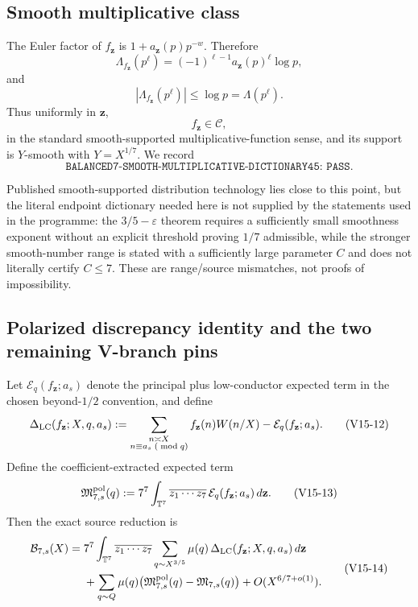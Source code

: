 \subsection*{Smooth multiplicative class}

The Euler factor of $f_{\mathbf z}$ is $1+a_{\mathbf z}(p)p^{-w}$.  Therefore
\[
 \Lambda_{f_{\mathbf z}}(p^\ell)
 =
 (-1)^{\ell-1}a_{\mathbf z}(p)^\ell\log p,
\]
and
\[
 |\Lambda_{f_{\mathbf z}}(p^\ell)|\le \log p=\Lambda(p^\ell).
 \tag{V15-10}
\]
Thus uniformly in $\mathbf z$,
\[
 f_{\mathbf z}\in\mathcal C,
\]
in the standard smooth-supported multiplicative-function sense, and its support is
$Y$-smooth with $Y=X^{1/7}$.
We record
\[
 \texttt{BALANCED7-SMOOTH-MULTIPLICATIVE-DICTIONARY45: PASS}.
 \tag{V15-11}
\]

Published smooth-supported distribution technology lies close to this point, but the
literal endpoint dictionary needed here is not supplied by the statements used in the
programme: the $3/5-\varepsilon$ theorem requires a sufficiently small smoothness exponent
without an explicit threshold proving $1/7$ admissible, while the stronger smooth-number
range is stated with a sufficiently large parameter $C$ and does not literally certify
$C\le7$.  These are range/source mismatches, not proofs of impossibility.

\subsection*{Polarized discrepancy identity and the two remaining V-branch pins}

Let $\mathcal E_q(f_{\mathbf z};a_s)$ denote the principal plus low-conductor expected term
in the chosen beyond-$1/2$ convention, and define
\[
 \Delta_{\rm LC}(f_{\mathbf z};X,q,a_s)
 :=
 \sum_{\substack{n\asymp X\\n\equiv a_s\;(\bmod q)}}
 f_{\mathbf z}(n)W(n/X)
 -
 \mathcal E_q(f_{\mathbf z};a_s).
 \tag{V15-12}
\]
Define the coefficient-extracted expected term
\[
 \mathfrak M^{\rm pol}_{7,s}(q)
 :=
 7^7\int_{\mathbb T^7}
 \overline{z_1\cdots z_7}\,
 \mathcal E_q(f_{\mathbf z};a_s)\,d\mathbf z.
 \tag{V15-13}
\]
Then the exact source reduction is
\[
 \begin{aligned}
 \mathcal B_{7,s}(X)
 ={}&
 7^7\int_{\mathbb T^7}
 \overline{z_1\cdots z_7}
 \sum_{q\sim X^{3/5}}
 \mu(q)\,
 \Delta_{\rm LC}(f_{\mathbf z};X,q,a_s)
 \,d\mathbf z
 \\
 &+
 \sum_{q\sim Q}\mu(q)
 \bigl(\mathfrak M^{\rm pol}_{7,s}(q)-\mathfrak M_{7,s}(q)\bigr)
 +O(X^{6/7+o(1)}).
 \end{aligned}
 \tag{V15-14}
\]

